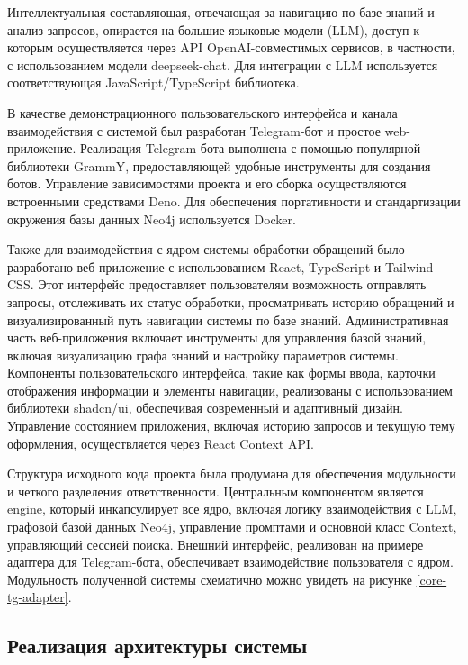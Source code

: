 Интеллектуальная составляющая, отвечающая за навигацию по базе знаний и анализ запросов, опирается на большие языковые модели (LLM), доступ к которым осуществляется через API OpenAI-совместимых\cite{openaiApi} сервисов, в частности, с использованием модели deepseek-chat\cite{deepseekApiDocs}. Для интеграции с LLM используется соответствующая JavaScript/TypeScript библиотека.

В качестве демонстрационного пользовательского интерфейса и канала взаимодействия с системой был разработан Telegram-бот и простое web-приложение. Реализация Telegram-бота выполнена с помощью популярной библиотеки GrammY\cite{grammY}, предоставляющей удобные инструменты для создания ботов. Управление зависимостями проекта и его сборка осуществляются встроенными средствами Deno. Для обеспечения портативности и стандартизации окружения базы данных Neo4j используется Docker.


Также для взаимодействия с ядром системы обработки обращений было разработано веб-приложение с использованием React, TypeScript и Tailwind CSS\cite{tailwind}. Этот интерфейс предоставляет пользователям возможность отправлять запросы, отслеживать их статус обработки, просматривать историю обращений и визуализированный путь навигации системы по базе знаний. Административная часть веб-приложения включает инструменты для управления базой знаний, включая визуализацию графа знаний и настройку параметров системы. Компоненты пользовательского интерфейса, такие как формы ввода, карточки отображения информации и элементы навигации, реализованы с использованием библиотеки shadcn/ui\cite{shadcn}, обеспечивая современный и адаптивный дизайн. Управление состоянием приложения, включая историю запросов и текущую тему оформления, осуществляется через React Context API. 

Структура исходного кода проекта была продумана для обеспечения модульности и четкого разделения ответственности. Центральным компонентом является engine, который инкапсулирует все ядро, включая логику взаимодействия с LLM, графовой базой данных Neo4j, управление промптами и основной класс Context, управляющий сессией поиска. Внешний интерфейс, реализован на примере адаптера для Telegram-бота, обеспечивает взаимодействие пользователя с ядром. Модульность полученной системы схематично можно увидеть на рисунке \ref{core-tg-adapter}.

\subsection{Реализация архитектуры системы}

